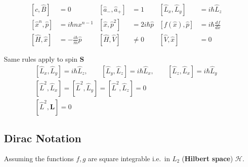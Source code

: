 \noindent\begin{align*}
    \left[c,\hat B\right]                  & =0                            & \left[\widehat{a}_{-},\widehat{a}_{+}\right] & = 1                  & \left[\widehat{L}_x,\widehat{L}_y\right] & =i\hbar\widehat{L}_z   \\
    \left[\widehat{x}^n,\widehat{p}\right] & = i \hbar n x^{n-1}           & \left[\widehat{x},\widehat{p}^2\right]       & = 2i\hbar\widehat{p} & \left[f(\widehat{x}),\widehat{p}\right]  & = i \hbar\frac{df}{dx} \\
    \left[\widehat{H},\widehat{x}\right]   & =-\frac{i\hbar}{m}\widehat{p} & \left[\widehat{H}, \widehat{V}\right]        & \neq 0               & \left[\widehat{V},\widehat{x}\right]     & =0
\end{align*}


\label{ang_mom_comm}

Same rules apply to spin $\mathbf{S}$
\noindent\begin{gather*}
    \left[\widehat{L}_{x},\widehat{L}_{y}\right] =i\hbar \widehat{L}_{z}, \qquad \left[\widehat{L}_{y},\widehat{L}_{z}\right]  =i\hbar \widehat{L}_{x}, \qquad \left[\widehat{L}_{z},\widehat{L}_{x}\right]  =i\hbar \widehat{L}_{y}      \\
    \left[\widehat{L}^{2},\widehat{L}_{x}\right] = \left[\widehat{L}^{2},\widehat{L}_{y}\right] = \left[\widehat{L}^{2},\widehat{L}_{z}\right] = 0\\
    \left[\widehat{L}^2, \mathbf{L}\right]=0
\end{gather*}

\subsection{Dirac Notation}
Assuming the functions $f,g$ are square integrable i.e.\ in $L_2$ (\textbf{Hilbert space}) $\mathcal{H}$.

